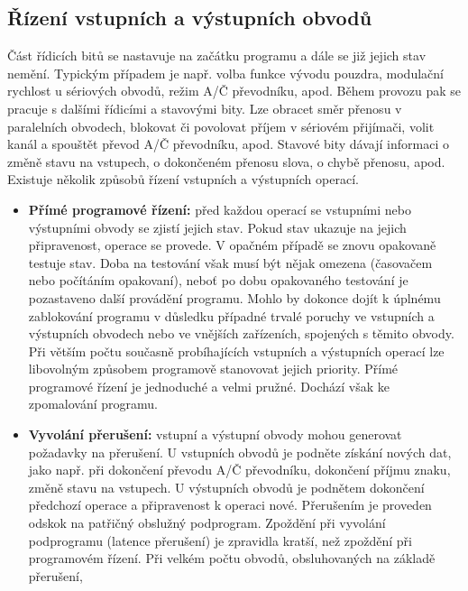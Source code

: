     \subsection{Řízení vstupních a výstupních obvodů}
      Část řídicích bitů se nastavuje na začátku programu a dále se již jejich stav nemění. 
      Typickým případem je např. volba funkce vývodu pouzdra, modulační rychlost u sériových 
      obvodů, režim A/Č převodníku, apod. Během provozu pak se pracuje s dalšími řídicími a 
      stavovými bity. Lze obracet směr přenosu v paralelních obvodech, blokovat či povolovat příjem 
      v sériovém přijímači, volit kanál a spouštět převod A/Č převodníku, apod. Stavové bity dávají 
      informaci o změně stavu na vstupech, o dokončeném přenosu slova, o chybě přenosu, apod. 
      Existuje několik způsobů řízení vstupních a výstupních operací.
      \begin{itemize}[noitemsep]
        \item  \textbf{Přímé programové řízení:} před každou operací se vstupními nebo 
               výstupními obvody se zjistí jejich stav. Pokud stav ukazuje na jejich připravenost, 
               operace se provede. V opačném případě se znovu opakovaně testuje stav. Doba na 
               testování však musí být nějak omezena (časovačem nebo počítáním opakovaní), neboť po 
               dobu opakovaného testování je pozastaveno další provádění programu. Mohlo by dokonce 
               dojít k úplnému zablokování programu v důsledku případné trvalé poruchy ve vstupních 
               a výstupních obvodech nebo ve vnějších zařízeních, spojených s těmito obvody. Při 
               větším počtu současně probíhajících vstupních a výstupních operací lze          
               libovolným způsobem programově stanovovat jejich priority. Přímé programové řízení 
               je jednoduché a velmi pružné. Dochází však ke zpomalování programu.
        \item  \textbf{Vyvolání přerušení:} vstupní a výstupní obvody mohou generovat požadavky na  
               přerušení. U vstupních obvodů je podněte získání nových dat, jako např. při 
               dokončení převodu A/Č převodníku, dokončení příjmu znaku, změně stavu na vstupech. U 
               výstupních obvodů je podnětem dokončení předchozí operace a připravenost k operaci 
               nové. Přerušením je proveden odskok na patřičný obslužný podprogram. Zpoždění při 
               vyvolání podprogramu (latence přerušení) je zpravidla kratší, než zpoždění při 
               programovém řízení. Při velkém počtu obvodů, obsluhovaných na základě přerušení, 

\end{itemize}
